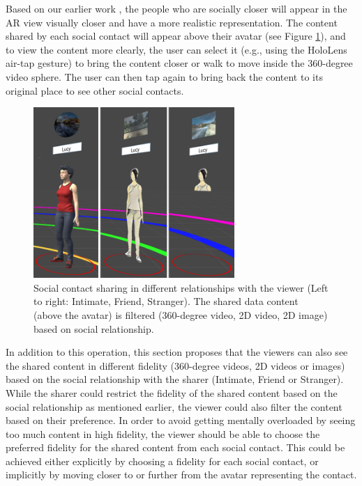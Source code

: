 Based on our earlier work \cite{Nassani2017a}, the people who are socially closer will appear in the AR view visually closer and have a more realistic representation. The content shared by each social contact will appear above their avatar (see Figure \ref{fig:data:viewer}), and to view the content more clearly, the user can select it (e.g., using the HoloLens air-tap gesture) to bring the content closer or walk to move inside the 360-degree video sphere. The user can then tap again to bring back the content to its original place to see other social contacts. 

\begin{figure}[ht]
    \centering
    \includegraphics[width=3in]{images/chi/3_levels_of_data.png}
    \caption{Social contact sharing in different relationships with the viewer (Left to right: Intimate, Friend, Stranger). The shared data content (above the avatar) is filtered (360-degree video, 2D video, 2D image) based on social relationship.}
      \label{fig:data:viewer}
\end{figure}

In addition to this operation, this section proposes that the viewers can also see the shared content in different fidelity (360-degree videos, 2D videos or images) based on the social relationship with the sharer (Intimate, Friend or Stranger). While the sharer could restrict the fidelity of the shared content based on the social relationship as mentioned earlier, the viewer could also filter the content based on their preference. In order to avoid getting mentally overloaded by seeing too much content in high fidelity, the viewer should be able to choose the preferred fidelity for the shared content from each social contact. This could be achieved either explicitly by choosing a fidelity for each social contact, or implicitly by moving closer to or further from the avatar representing the contact.      

